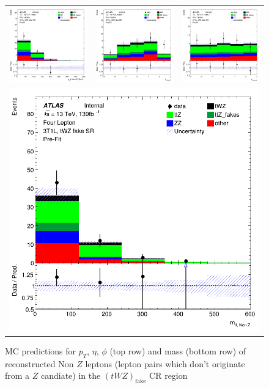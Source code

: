 \begin{figure}[htbp]
\centering
  \begin{tabular}{ccc}

    \includegraphics[width=.2\textwidth]{figures/PreFitPlots/lep4_tWZ_3T1L_nonZll_sys_pt}&
    \includegraphics[width=.2\textwidth]{figures/PreFitPlots/lep4_tWZ_3T1L_nonZll_sys_eta} &
    \includegraphics[width=.2\textwidth]{figures/PreFitPlots/lep4_tWZ_3T1L_nonZll_sys_phi} \\
    \multicolumn{3}{c}{\includegraphics[width=.2\textwidth]{figures/PreFitPlots/lep4_tWZ_3T1L_nonZll_sys_mass}}

  \end{tabular}
      \caption{MC predictions for $p_{T}$, $\eta$, $\phi$ (top row) and mass (bottom row) of reconstructed Non $Z$ leptons (lepton pairs which don't originate from a $Z$ candiate) in the $(tWZ)_{\text{fake}}$ CR region }
  \label{fig:4lep-3T1L-CR-NonZLeps-sys-Plots}
\end{figure}
\clearpage

